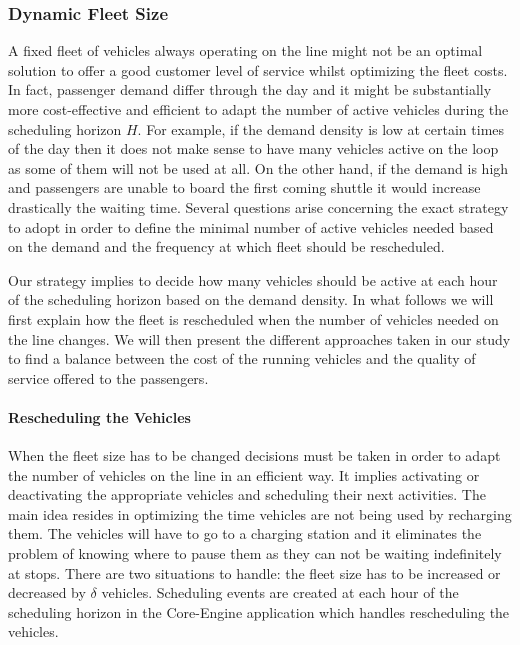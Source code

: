 \documentclass[12pt,a4paper]{article}
\begin{document}
\subsubsection{Dynamic Fleet Size}\label{dynamic}
A fixed fleet of vehicles always operating on the line might not be an optimal solution to offer a good customer level of service whilst optimizing the fleet costs. In fact, passenger demand differ through the day and it might be substantially more cost-effective and efficient to adapt the number of active vehicles during the scheduling horizon $H$. For example, if the demand density is low at certain times of the day then it does not make sense to have many vehicles active on the loop as some of them will not be used at all. On the other hand, if the demand is high and passengers are unable to board the first coming shuttle it would increase drastically the waiting time. Several questions arise concerning the exact strategy to adopt in order to define the minimal number of active vehicles needed based on the demand and the frequency at which fleet should be rescheduled. 

Our strategy implies to decide how many vehicles should be active at each hour of the scheduling horizon based on the demand density. In what follows we will first explain how the fleet is rescheduled when the number of vehicles needed on the line changes. We will then present the different approaches taken in our study to find a balance between the cost of the running vehicles and the quality of service offered to the passengers. 

\paragraph{Rescheduling the Vehicles} When the fleet size has to be changed decisions must be taken in order to adapt the number of vehicles on the line in an efficient way. It implies activating or deactivating the appropriate vehicles and scheduling their next activities. The main idea resides in optimizing the time vehicles are not being used by recharging them. The vehicles will have to go to a charging station and it eliminates the problem of knowing where to pause them as they can not be waiting indefinitely at stops. There are two situations to handle: the fleet size has to be increased or decreased by $\delta$ vehicles. Scheduling events are created at each hour of the scheduling horizon in the Core-Engine application which handles rescheduling the vehicles.
\end{document}
